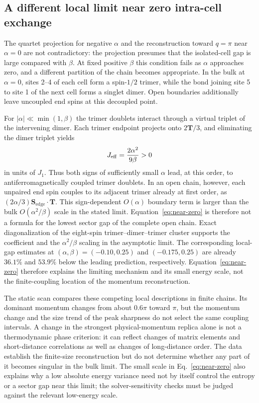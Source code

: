 \subsection{A different local limit near zero intra-cell exchange}

The quartet projection for negative $\alpha$ and the reconstruction toward
$q=\pi$ near $\alpha=0$ are not contradictory: the projection presumes that
the isolated-cell gap is large compared with $\beta$.
At fixed positive $\beta$ this condition fails as $\alpha$ approaches zero,
and a different partition of the chain becomes appropriate.
In the bulk at $\alpha=0$, sites 2--4 of each cell form a spin-$1/2$ trimer,
while the bond joining site 5 to site 1 of the next cell forms a singlet
dimer. Open boundaries additionally leave uncoupled end spins at this
decoupled point.

For $|\alpha|\ll\min(1,\beta)$ the trimer doublets interact through a virtual
triplet of the intervening dimer. Each trimer endpoint projects onto
$2\bm T/3$, and eliminating the dimer triplet yields
\begin{equation}
J_{\mathrm{eff}}=\frac{2\alpha^2}{9\beta}>0
\label{eq:near-zero}
\end{equation}
in units of $J_1$.
Thus both signs of sufficiently small $\alpha$ lead, at this order, to
antiferromagnetically coupled trimer doublets.
In an open chain, however, each unpaired end spin couples to its adjacent
trimer already at first order, as
$(2\alpha/3)\bm S_{\mathrm{edge}}\!\cdot\!\bm T$.
This sign-dependent $O(\alpha)$ boundary term is larger than the bulk
$O(\alpha^2/\beta)$ scale in the stated limit.
Equation~\eqref{eq:near-zero} is therefore not a formula for the lowest
sector gap of the complete open chain.
Exact diagonalization of the eight-spin trimer--dimer--trimer cluster
supports the coefficient and the $\alpha^2/\beta$ scaling in the
asymptotic limit. The corresponding local-gap estimates at
$(\alpha,\beta)=(-0.10,0.25)$ and $(-0.175,0.25)$ are already
$36.1\%$ and $53.9\%$ below the leading prediction, respectively.
Equation~\eqref{eq:near-zero} therefore explains the limiting mechanism
and its small energy scale, not the finite-coupling location of the
momentum reconstruction.

The static scan compares these competing local descriptions in finite
chains. Its dominant momentum changes from about $0.6\pi$ toward $\pi$,
but the momentum change and the size trend of the peak sharpness do not
select the same coupling intervals.
A change in the strongest physical-momentum replica alone is not a
thermodynamic phase criterion: it can reflect changes of matrix elements
and short-distance correlations as well as changes of long-distance order.
The data establish the finite-size reconstruction but do not determine
whether any part of it becomes singular in the bulk limit.
The small scale in Eq.~\eqref{eq:near-zero} also explains why a low absolute
energy variance need not by itself control the entropy or a sector gap near
this limit; the solver-sensitivity checks must be judged against the relevant
low-energy scale.

